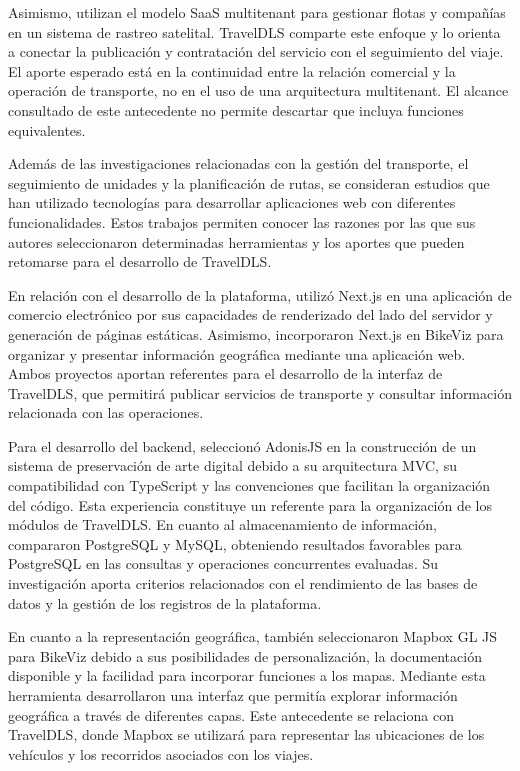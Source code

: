 Asimismo, \textcite{lasluisa2026diseno} utilizan el modelo SaaS multitenant para gestionar flotas y compañías en un sistema de rastreo satelital. TravelDLS comparte este enfoque y lo orienta a conectar la publicación y contratación del servicio con el seguimiento del viaje. El aporte esperado está en la continuidad entre la relación comercial y la operación de transporte, no en el uso de una arquitectura multitenant. El alcance consultado de este antecedente no permite descartar que incluya funciones equivalentes.


Además de las investigaciones relacionadas con la gestión del transporte, el seguimiento de unidades y la planificación de rutas, se consideran estudios que han utilizado tecnologías para desarrollar aplicaciones web con diferentes funcionalidades. Estos trabajos permiten conocer las razones por las que sus autores seleccionaron determinadas herramientas y los aportes que pueden retomarse para el desarrollo de TravelDLS.

En relación con el desarrollo de la plataforma, \textcite{nguyen2022building} utilizó Next.js en una aplicación de comercio electrónico por sus capacidades de renderizado del lado del servidor y generación de páginas estáticas. Asimismo, \textcite{kolding2021developing} incorporaron Next.js en BikeViz para organizar y presentar información geográfica mediante una aplicación web. Ambos proyectos aportan referentes para el desarrollo de la interfaz de TravelDLS, que permitirá publicar servicios de transporte y consultar información relacionada con
las operaciones.

Para el desarrollo del backend, \textcite{farinha2025arkivo} seleccionó AdonisJS en la construcción de un sistema de preservación de arte digital debido a su arquitectura MVC, su compatibilidad con TypeScript y las convenciones que facilitan la organización del código. Esta experiencia constituye un referente para la organización de los módulos de TravelDLS. En cuanto al almacenamiento de información,
\textcite{salunke2024performance} compararon PostgreSQL y MySQL, obteniendo resultados favorables para PostgreSQL en las consultas y operaciones concurrentes evaluadas. Su
investigación aporta criterios relacionados con el rendimiento de las bases de datos y la gestión de los registros de la plataforma.

En cuanto a la representación geográfica, \textcite{kolding2021developing} también seleccionaron Mapbox GL JS para BikeViz debido a sus posibilidades de personalización, la documentación disponible y la facilidad para incorporar funciones a los mapas. Mediante esta herramienta desarrollaron una interfaz que permitía explorar información geográfica a través de diferentes capas. Este antecedente se relaciona con TravelDLS, donde Mapbox se utilizará para representar las ubicaciones de los vehículos y los recorridos asociados con los viajes.

